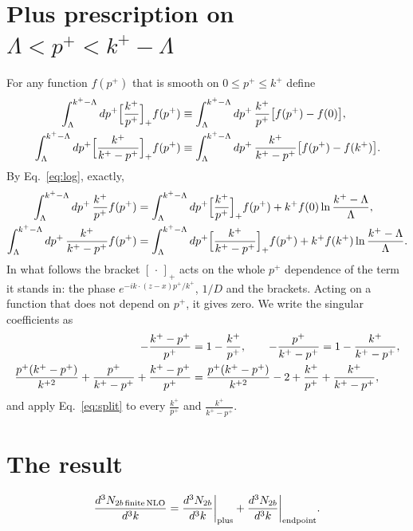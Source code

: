 \documentclass[10pt]{article}
\begin{document}
\section{Plus prescription on \texorpdfstring{$\Lambda<p^+<k^+-\Lambda$}{Lambda < p+ < k+ - Lambda}}
For any function $f(p^+)$ that is smooth on $0\le p^+\le k^+$ define
\begin{align}
\int_{\Lambda}^{k^+-\Lambda}dp^+\Big[\frac{k^+}{p^+}\Big]_+f(p^+)&\equiv\int_{\Lambda}^{k^+-\Lambda}dp^+\,\frac{k^+}{p^+}\big[f(p^+)-f(0)\big],\notag\\
\int_{\Lambda}^{k^+-\Lambda}dp^+\Big[\frac{k^+}{k^+-p^+}\Big]_+f(p^+)&\equiv\int_{\Lambda}^{k^+-\Lambda}dp^+\,\frac{k^+}{k^+-p^+}\big[f(p^+)-f(k^+)\big].
\label{eq:plusdef}
\end{align}
By Eq.~\eqref{eq:log}, exactly,
\begin{align}
\int_{\Lambda}^{k^+-\Lambda}dp^+\,\frac{k^+}{p^+}f(p^+)&=\int_{\Lambda}^{k^+-\Lambda}dp^+\Big[\frac{k^+}{p^+}\Big]_+f(p^+)+k^+f(0)\ln\frac{k^+-\Lambda}{\Lambda},\notag\\
\int_{\Lambda}^{k^+-\Lambda}dp^+\,\frac{k^+}{k^+-p^+}f(p^+)&=\int_{\Lambda}^{k^+-\Lambda}dp^+\Big[\frac{k^+}{k^+-p^+}\Big]_+f(p^+)+k^+f(k^+)\ln\frac{k^+-\Lambda}{\Lambda}.
\label{eq:split}
\end{align}
In what follows the bracket $[\,\cdot\,]_+$ acts on the whole $p^+$ dependence of the term it stands in: the phase $e^{-ik\cdot(z-x)p^+/k^+}$, $1/D$ and the brackets. Acting on a function that does not depend on $p^+$, it gives zero. We write the singular coefficients as
\begin{align}
-\frac{k^+-p^+}{p^+}&=1-\frac{k^+}{p^+},\qquad
-\frac{p^+}{k^+-p^+}=1-\frac{k^+}{k^+-p^+},\notag\\
\frac{p^{+}(k^{+}-p^{+})}{k^{+2}}+\frac{p^{+}}{k^{+}-p^{+}}+\frac{k^{+}-p^{+}}{p^{+}}&=\frac{p^{+}(k^{+}-p^{+})}{k^{+2}}-2+\frac{k^+}{p^+}+\frac{k^+}{k^+-p^+},
\end{align}
and apply Eq.~\eqref{eq:split} to every $\frac{k^+}{p^+}$ and $\frac{k^+}{k^+-p^+}$.

\section{The result}
\begin{equation}
\frac{d^{3}N_{2b\,\rm finite\,NLO}}{d^{3}k}=\frac{d^{3}N_{2b}}{d^{3}k}\bigg|_{\rm plus}+\frac{d^{3}N_{2b}}{d^{3}k}\bigg|_{\rm endpoint}.
\end{equation}
\end{document}
